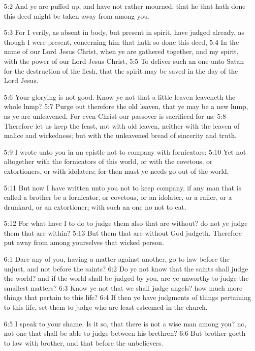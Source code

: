 5:2 And ye are puffed up, and have not rather mourned, that he that hath done this deed might be taken away from among you.

5:3 For I verily, as absent in body, but present in spirit, have judged already, as though I were present, concerning him that hath so done this deed, 5:4 In the name of our Lord Jesus Christ, when ye are gathered together, and my spirit, with the power of our Lord Jesus Christ, 5:5 To deliver such an one unto Satan for the destruction of the flesh, that the spirit may be saved in the day of the Lord Jesus.

5:6 Your glorying is not good. Know ye not that a little leaven leaveneth the whole lump?  5:7 Purge out therefore the old leaven, that ye may be a new lump, as ye are unleavened. For even Christ our passover is sacrificed for us: 5:8 Therefore let us keep the feast, not with old leaven, neither with the leaven of malice and wickedness; but with the unleavened bread of sincerity and truth.

5:9 I wrote unto you in an epistle not to company with fornicators: 5:10 Yet not altogether with the fornicators of this world, or with the covetous, or extortioners, or with idolaters; for then must ye needs go out of the world.

5:11 But now I have written unto you not to keep company, if any man that is called a brother be a fornicator, or covetous, or an idolater, or a railer, or a drunkard, or an extortioner; with such an one no not to eat.

5:12 For what have I to do to judge them also that are without? do not ye judge them that are within?  5:13 But them that are without God judgeth. Therefore put away from among yourselves that wicked person.

6:1 Dare any of you, having a matter against another, go to law before the unjust, and not before the saints?  6:2 Do ye not know that the saints shall judge the world? and if the world shall be judged by you, are ye unworthy to judge the smallest matters?  6:3 Know ye not that we shall judge angels? how much more things that pertain to this life?  6:4 If then ye have judgments of things pertaining to this life, set them to judge who are least esteemed in the church.

6:5 I speak to your shame. Is it so, that there is not a wise man among you? no, not one that shall be able to judge between his brethren?  6:6 But brother goeth to law with brother, and that before the unbelievers.

